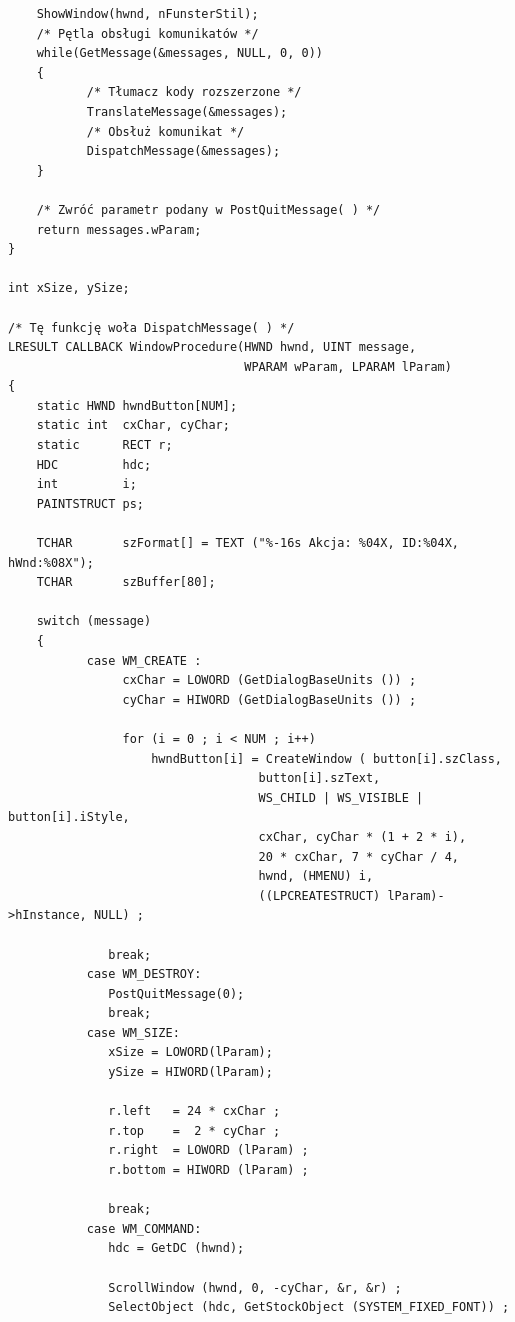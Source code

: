 \begin{scriptsize}
\begin{verbatim}
    ShowWindow(hwnd, nFunsterStil);
    /* Pętla obsługi komunikatów */
    while(GetMessage(&messages, NULL, 0, 0))
    {
           /* Tłumacz kody rozszerzone */
           TranslateMessage(&messages);
           /* Obsłuż komunikat */
           DispatchMessage(&messages);
    }

    /* Zwróć parametr podany w PostQuitMessage( ) */
    return messages.wParam;
}

int xSize, ySize;

/* Tę funkcję woła DispatchMessage( ) */
LRESULT CALLBACK WindowProcedure(HWND hwnd, UINT message, 
                                 WPARAM wParam, LPARAM lParam)
{
    static HWND hwndButton[NUM];
    static int  cxChar, cyChar;  
    static      RECT r;
    HDC         hdc; 
    int         i;
    PAINTSTRUCT ps;

    TCHAR       szFormat[] = TEXT ("%-16s Akcja: %04X, ID:%04X, hWnd:%08X");
    TCHAR       szBuffer[80];
    
    switch (message)                  
    {
           case WM_CREATE :
                cxChar = LOWORD (GetDialogBaseUnits ()) ;
                cyChar = HIWORD (GetDialogBaseUnits ()) ;
                          
                for (i = 0 ; i < NUM ; i++)
                    hwndButton[i] = CreateWindow ( button[i].szClass, 
                                   button[i].szText,
                                   WS_CHILD | WS_VISIBLE | button[i].iStyle,
                                   cxChar, cyChar * (1 + 2 * i),
                                   20 * cxChar, 7 * cyChar / 4,
                                   hwnd, (HMENU) i,
                                   ((LPCREATESTRUCT) lParam)->hInstance, NULL) ;

              break;
           case WM_DESTROY:
              PostQuitMessage(0);        
              break;
           case WM_SIZE:
              xSize = LOWORD(lParam); 
              ySize = HIWORD(lParam); 
              
              r.left   = 24 * cxChar ;
              r.top    =  2 * cyChar ;
              r.right  = LOWORD (lParam) ;
              r.bottom = HIWORD (lParam) ;
              
              break;   
           case WM_COMMAND:
              hdc = GetDC (hwnd);
     
              ScrollWindow (hwnd, 0, -cyChar, &r, &r) ;              
              SelectObject (hdc, GetStockObject (SYSTEM_FIXED_FONT)) ;
          

\end{verbatim}
\end{scriptsize}
